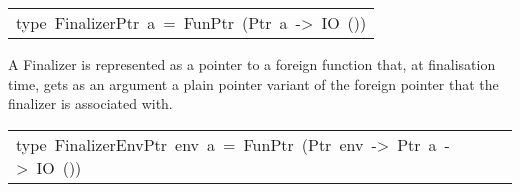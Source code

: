 \begin{haddockdesc}
\item[\begin{tabular}{@{}l}
type\ FinalizerPtr\ a\ =\ FunPtr\ (Ptr\ a\ ->\ IO\ ())
\end{tabular}]\haddockbegindoc
A Finalizer is represented as a pointer to a foreign function that, at
 finalisation time, gets as an argument a plain pointer variant of the
 foreign pointer that the finalizer is associated with.
\par

\end{haddockdesc}
\begin{haddockdesc}
\item[\begin{tabular}{@{}l}
type\ FinalizerEnvPtr\ env\ a\ =\ FunPtr\ (Ptr\ env\ ->\ Ptr\ a\ ->\ IO\ ())
\end{tabular}]
\end{haddockdesc}
